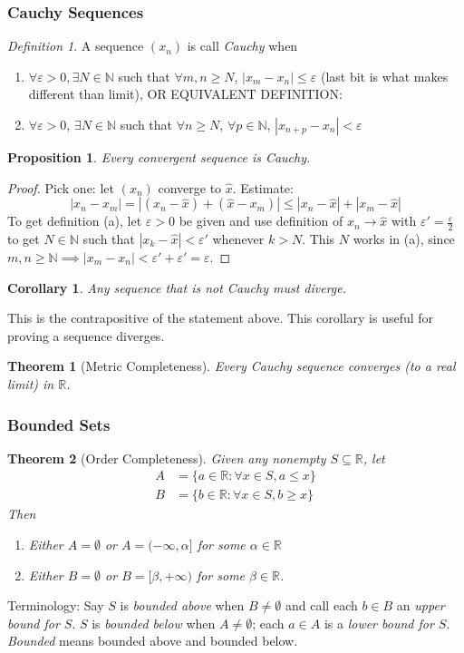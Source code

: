 \documentclass{article}
\theoremstyle{plain}
\newtheorem{theorem}{Theorem}
\newtheorem{proposition}{Proposition}
\newtheorem{corollary}{Corollary}
\theoremstyle{remark}
\newtheorem{definition}{Definition}
\newcommand{\N}{{\mathbb N}}
\newcommand{\R}{{\mathbb R}}
\newcommand{\ep}{{\varepsilon}}
\begin{document}
\subsubsection{Cauchy Sequences}
\begin{definition}
	A sequence $(x_n)$ is call {\it Cauchy} when
	\begin{enumerate}
		\item $\forall \ep > 0, \exists N \in \N$ such that
		$\forall m,n \geq N$, $|x_m - x_n| \leq \ep$
		(last bit is what makes different than limit),
		OR EQUIVALENT DEFINITION:
		\item $\forall \ep > 0$, $\exists N \in \N$ such that
			$\forall n \geq N$, $\forall p \in \N$, $|x_{n+p}-x_n| < \ep$
	\end{enumerate}
\end{definition}
\begin{proposition}
	Every convergent sequence is Cauchy.
\end{proposition}
\begin{proof}
	Pick one: let $(x_n)$ converge to $\hat{x}$.
	Estimate:
	\[
		|x_n - x_m| = |(x_n - \hat{x}) + (\hat{x} - x_m)|
		\leq |x_n - \hat{x}| +|x_m - \hat{x}|
	\]
	To get definition (a), let $\ep>0$ be given and use definition
	of $x_n \to \hat{x}$ with $\ep' = \frac{\ep}{2}$ to get $N \in \N$
	such that $|x_k - \hat{x}| < \ep'$ whenever $k > N$.
	This $N$ works in (a), since $m,n\geq\N \implies |x_m - x_n| < \ep'+\ep' = \ep$.
\end{proof}
\begin{corollary}
	Any sequence that is not Cauchy must diverge.
\end{corollary}
This is the contrapositive of the statement above.
This corollary is useful for proving a sequence diverges.

\begin{theorem}[Metric Completeness]
	Every Cauchy sequence converges (to a real limit) in $\R$.
\end{theorem}

\subsubsection{Bounded Sets}
\begin{theorem}[Order Completeness]
	Given any nonempty $S \subseteq \R$, let
	\begin{align*}
		A &= \{a\in\R \colon \forall x \in S, a \leq x\}\\
		B &= \{b\in\R \colon \forall x \in S, b \geq x\}
	\end{align*}
	Then
	\begin{enumerate}
		\item Either $A = \emptyset$ or $A = (-\infty, \alpha]$ for some $\alpha \in \R$
		\item Either $B = \emptyset$ or $B = [\beta,+\infty)$ for some $\beta \in \R$.
	\end{enumerate}
\end{theorem}
Terminology: Say $S$ is {\it bounded above} when $B \neq \emptyset$
and call each $b \in B$ an {\it upper bound for $S$}.
$S$ is {\it bounded below} when $A \neq \emptyset$;
each $a \in A$ is a {\it lower bound for $S$}.
{\it Bounded} means bounded above and bounded below.
\end{document}
